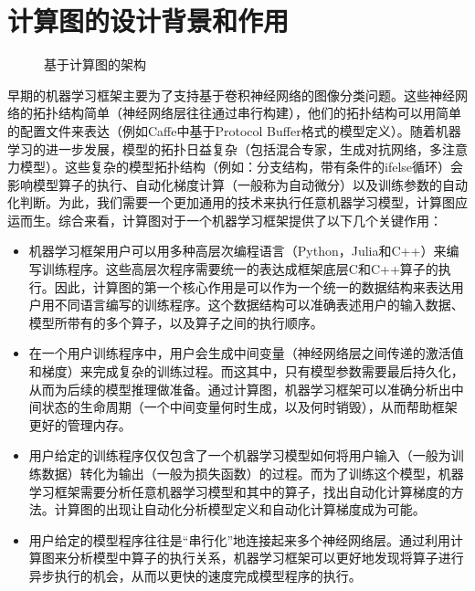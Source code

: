 \documentclass[letterpaper,10pt,english]{sphinxmanual}
\let\sphinxpxdimen\pdfpxdimen\else\newdimen\sphinxpxdimen
\begin{document}
\section{计算图的设计背景和作用}
\label{\detokenize{chapter_computational_graph/background_and_functionality:id1}}\label{\detokenize{chapter_computational_graph/background_and_functionality::doc}}
\begin{figure}[H]
\centering
\capstart

\noindent\sphinxincludegraphics[width=800\sphinxpxdimen]{{dag}.svg}
\caption{基于计算图的架构}\label{\detokenize{chapter_computational_graph/background_and_functionality:id2}}\label{\detokenize{chapter_computational_graph/background_and_functionality:dag}}\end{figure}

\sphinxAtStartPar
早期的机器学习框架主要为了支持基于卷积神经网络的图像分类问题。这些神经网络的拓扑结构简单（神经网络层往往通过串行构建），他们的拓扑结构可以用简单的配置文件来表达（例如Caffe中基于Protocol
Buffer格式的模型定义）。随着机器学习的进一步发展，模型的拓扑日益复杂（包括混合专家，生成对抗网络，多注意力模型）。这些复杂的模型拓扑结构（例如：分支结构，带有条件的if\sphinxhyphen{}else循环）会影响模型算子的执行、自动化梯度计算（一般称为自动微分）以及训练参数的自动化判断。为此，我们需要一个更加通用的技术来执行任意机器学习模型，计算图应运而生。综合来看，计算图对于一个机器学习框架提供了以下几个关键作用：
\begin{itemize}
\item {} 
\sphinxAtStartPar
{}
机器学习框架用户可以用多种高层次编程语言（Python，Julia和C++）来编写训练程序。这些高层次程序需要统一的表达成框架底层C和C++算子的执行。因此，计算图的第一个核心作用是可以作为一个统一的数据结构来表达用户用不同语言编写的训练程序。这个数据结构可以准确表述用户的输入数据、模型所带有的多个算子，以及算子之间的执行顺序。

\item {} 
\sphinxAtStartPar
{}
在一个用户训练程序中，用户会生成中间变量（神经网络层之间传递的激活值和梯度）来完成复杂的训练过程。而这其中，只有模型参数需要最后持久化，从而为后续的模型推理做准备。通过计算图，机器学习框架可以准确分析出中间状态的生命周期（一个中间变量何时生成，以及何时销毁），从而帮助框架更好的管理内存。

\item {} 
\sphinxAtStartPar
{}
用户给定的训练程序仅仅包含了一个机器学习模型如何将用户输入（一般为训练数据）转化为输出（一般为损失函数）的过程。而为了训练这个模型，机器学习框架需要分析任意机器学习模型和其中的算子，找出自动化计算梯度的方法。计算图的出现让自动化分析模型定义和自动化计算梯度成为可能。

\item {} 
\sphinxAtStartPar
{}
用户给定的模型程序往往是“串行化”地连接起来多个神经网络层。通过利用计算图来分析模型中算子的执行关系，机器学习框架可以更好地发现将算子进行异步执行的机会，从而以更快的速度完成模型程序的执行。

\end{itemize}
\end{document}
